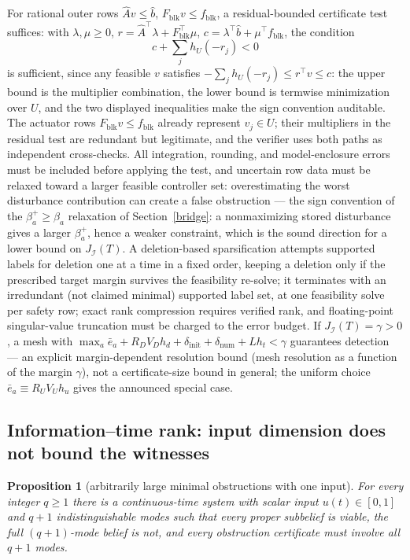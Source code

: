 \documentclass[10pt,twocolumn]{article}
\theoremstyle{plain}
\newtheorem{proposition}[theorem]{Proposition}
\theoremstyle{definition}
\theoremstyle{remark}
\begin{document}
For rational outer rows \(\widehat A v \le \widehat b\),
\(F_{\mathrm{blk}} v \le f_{\mathrm{blk}}\), a residual-bounded certificate
test suffices: with \(\lambda, \mu \ge 0\),
\(r = \widehat A^\top \lambda + F_{\mathrm{blk}}^\top \mu\),
\(c = \lambda^\top \widehat b + \mu^\top f_{\mathrm{blk}}\), the condition
\[
c + \sum_j h_U(-r_j) < 0
\tag{11}
\]
is sufficient, since any feasible \(v\) satisfies
\(-\sum_j h_U(-r_j) \le r^\top v \le c\): the upper bound is the
multiplier combination, the lower bound is termwise minimization over
\(U\), and the two displayed inequalities make the sign convention
auditable. The actuator rows \(F_{\mathrm{blk}} v \le f_{\mathrm{blk}}\)
already represent \(v_j \in U\); their multipliers in the residual test
are redundant but legitimate, and the verifier uses both paths as
independent cross-checks. All integration, rounding, and
model-enclosure errors must be included before applying the test, and
uncertain row data must be relaxed toward a larger feasible controller set:
overestimating the worst disturbance contribution can create a false
obstruction --- the sign convention of the \(\beta_a^{+} \ge \beta_a\)
relaxation of Section~\ref{bridge}: a nonmaximizing stored disturbance
gives a larger \(\beta_a^{+}\), hence a weaker constraint, which is the
sound direction for a lower bound on \(J_{\mathcal{I}}(T)\). A deletion-based sparsification attempts supported labels for deletion
one at a time in a fixed order, keeping a deletion only if the prescribed
target margin survives the feasibility re-solve; it terminates with an
irredundant (not claimed minimal) supported label set, at one feasibility
solve per safety row; exact rank compression requires verified rank, and
floating-point singular-value truncation must be charged to the error budget.
If \(J_{\mathcal{I}}(T) = \gamma > 0\), a mesh with
\(\max_a \bar{e}_a + R_D V_D h_d + \delta_{\mathrm{init}} +
\delta_{\mathrm{num}} + L h_t < \gamma\) guarantees detection --- an explicit margin-dependent resolution bound
(mesh resolution as a function of the margin \(\gamma\)), not a
certificate-size bound in general; the uniform choice \(\bar{e}_a
\equiv R_U V_U h_u\) gives the announced special case.

\subsection{Information--time rank: input dimension does not bound the witnesses}\label{rank}

\begin{proposition}[arbitrarily large minimal obstructions with one input]\label{prop:rank}
For every integer \(q \ge 1\) there is a continuous-time system with scalar
input \(u(t) \in [0,1]\) and \(q+1\) indistinguishable modes such that every
proper subbelief is viable, the full \((q{+}1)\)-mode belief is not, and
every obstruction certificate must involve all \(q+1\) modes.
\end{proposition}
\end{document}
